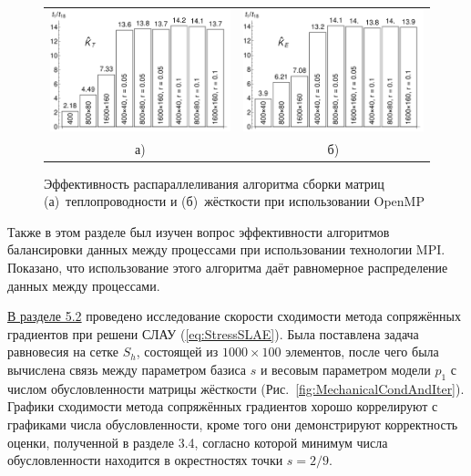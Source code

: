 \begin{figure}[ht] \centering
	\begin{tabular}{cc}
		\includegraphics[width=0.4\linewidth]{pics/OMPThermal.pdf} &
		\includegraphics[width=0.4\linewidth]{pics/OMPMechanical.pdf} \\
		а) & б)
	\end{tabular}
    \caption{Эффективность распараллеливания алгоритма сборки матриц (а)~теплопроводности и (б)~жёсткости при использовании OpenMP}
    \label{fig:OMPParallelization}
\end{figure}

Также в этом разделе был изучен вопрос эффективности алгоритмов балансировки данных между процессами при использовании технологии MPI. Показано, что использование этого алгоритма даёт равномерное распределение данных между процессами.

\underline{В разделе 5.2} проведено исследование скорости сходимости метода сопряжённых градиентов при решени СЛАУ (\ref{eq:StressSLAE}). Была поставлена задача равновесия на сетке $S_h$, состоящей из $1000 \times 100$ элементов, после чего была вычислена связь между параметром базиса $s$ и весовым параметром модели $p_1$ с числом обусловленности матрицы жёсткости (Рис.~\ref{fig:MechanicalCondAndIter}). Графики сходимости метода сопряжённых градиентов хорошо коррелируют с графиками числа обусловленности, кроме того они демонстрируют корректность оценки, полученной в разделе 3.4, согласно которой минимум числа обусловленности находится в окрестностях точки $s = 2/9$.

